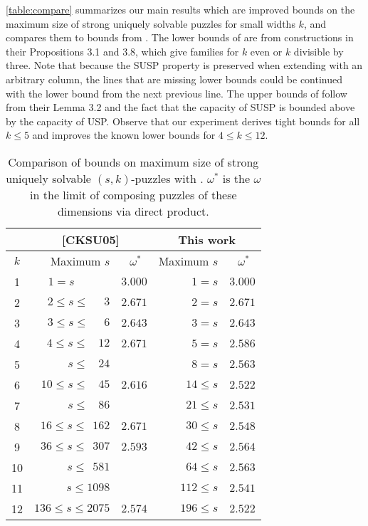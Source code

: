 \documentclass[11pt]{article}
\begin{document}
\autoref{table:compare} summarizes our main results which are improved
bounds on the maximum size of strong uniquely solvable puzzles for
small widths $k$, and compares them to bounds from \cite{cksu05}.  The
lower bounds of \cite{cksu05} are from constructions in their
Propositions 3.1 and 3.8, which give families for $k$ even or $k$
divisible by three.  Note that because the SUSP property is preserved
when extending with an arbitrary column, the lines that are missing
lower bounds could be continued with the lower bound from the next
previous line.  The upper bounds of \cite{cksu05} follow from their
Lemma 3.2 and the fact that the capacity of SUSP is bounded above by
the capacity of USP.  Observe that our experiment derives tight bounds
for all $k \le 5$ and improves the known lower bounds for $4 \le k \le 12$.
\begin{table}
  \label{table:compare}
  \begin{center}
  \begin{tabular}{|c|r|r|r|r|}
    \hline
    & \multicolumn{2}{|c|}{[CKSU05]} & \multicolumn{2}{|c|}{This work} \\
    \hline
    $k$ & Maximum $s$ & $\omega^*$~ & Maximum $s$ & $\omega^*$~\\
    \hline
    1 & $1 = s \;\,~~~~~~~~~~~~$ & $3.000$ & $1=s$ & $3.000$  \\
    2 & $2 \le s\le ~~~~~~3$ & $2.671$ & $2=s$ & $2.671$ \\
    3 & $3 \le s \le ~~~~~~6$ & $2.643$ & $3=s$ & $2.643$ \\
    4 & $4 \le s\le ~~~~12$ & $2.671$ & $5=s$ & $2.586$ \\
    5 & $ s\le ~~~~24$ &  & $8=s$ & $2.563$  \\
    6 & $10 \le s \le ~~~~45$ & $2.616$ &$14\le s$ & $2.522$\\
    7 & $s\le ~~~~86$ &  & $21\le s$ & $2.531$ \\
    8 & $16 \le s\le ~~162$ & $2.671$ & $30\le s$ & $2.548$ \\
    9 & $36 \le s \le ~~307$ & $2.593$ &$42\le s$ & $2.564$  \\
    10 & $s \le ~~581$ & & $64 \le s$ & $2.563$ \\ 
    11 & $s \le 1098$ &  & $112 \le s$ & $2.541$ \\
    12 & $136 \le s \le 2075$ & $2.574$ & $196 \le s$ & $2.522$ \\
    \hline
  \end{tabular}
  \end{center}
  \caption{Comparison of bounds on maximum size of strong uniquely
    solvable $(s,k)$-puzzles with \cite{cksu05}.  $\omega^*$ is the
    $\omega$ in the limit of composing puzzles of these dimensions via
    direct product.}
\end{table}
\end{document}
